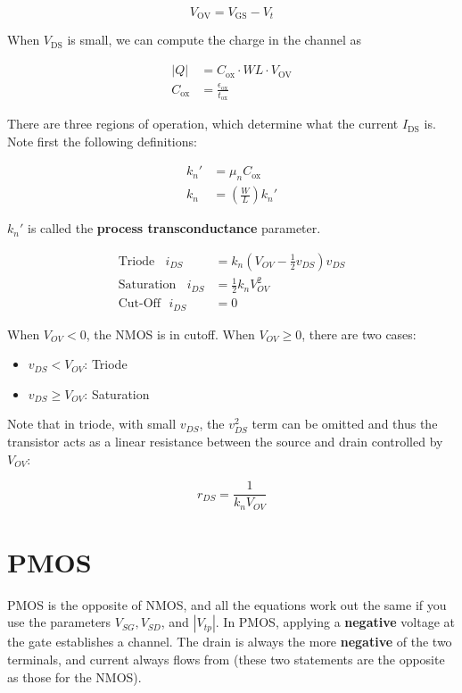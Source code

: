 \documentclass[11pt]{report}
\begin{document}
 \begin{equation}
 	\label{eqn:overdrive-voltage}
 	V_\text{OV} = V_\text{GS} - V_t
 \end{equation}

When $V_\text{DS}$ is small, we can compute the charge in the channel as

\begin{align}
	\label{eqn:nmos-channel-charge}
	|Q| &= C_{\text{ox}} \cdot W L \cdot V_{\text{OV}} \\
	C_\text{ox} &= \frac{\epsilon_\text{ox}}{t_\text{ox}}
\end{align}

 There are three regions of operation, which determine what the current $I_{\text{DS}}$ is. Note first the following definitions:

 \begin{align}
 	\label{eqn:transconductance}
 	k_n' &= \mu_nC_\text{ox} \\
 	k_n &= \left(\frac{W}{L}\right)k_n'
 \end{align}

$k_n'$ is called the \textbf{process transconductance} parameter.

 \begin{align}
 	\label{eqn:nmos-regions-of-operation}
 	\text{Triode} \ \ \ \ i_{DS} &= k_n\left(V_{OV} - \frac{1}{2}v_{DS}\right)v_{DS}\\
 	\text{Saturation} \ \ \ \ i_{DS} &= \frac{1}{2}k_nV_{OV}^2\\
 	\text{Cut-Off} \ \ \ i_{DS} &= 0
 \end{align}

 When $V_{OV} < 0$, the NMOS is in cutoff. When $V_{OV} \ge 0$, there are two cases:

 \begin{itemize}
 	\item $v_{DS} < V_{OV}$: Triode
 	\item $v_{DS} \ge V_{OV}$: Saturation
 \end{itemize}

Note that in triode, with small $v_{DS}$, the $v_{DS}^2$ term can be omitted and thus the transistor acts as a linear resistance between the source and drain controlled by $V_{OV}$:

\begin{equation}
	\label{eqn:linear-resistance-nmos}
	r_{DS} = \frac{1}{k_nV_{OV}}
\end{equation}

\section{PMOS}
PMOS is the opposite of NMOS, and all the equations work out the same if you use the parameters $V_{SG}, V_{SD}$, and $|V_{tp}|$. In PMOS, applying a \textbf{negative} voltage at the gate establishes a channel. The drain is always the more \textbf{negative} of the two terminals, and current always flows from  (these two statements are the opposite as those for the NMOS).
\end{document}
